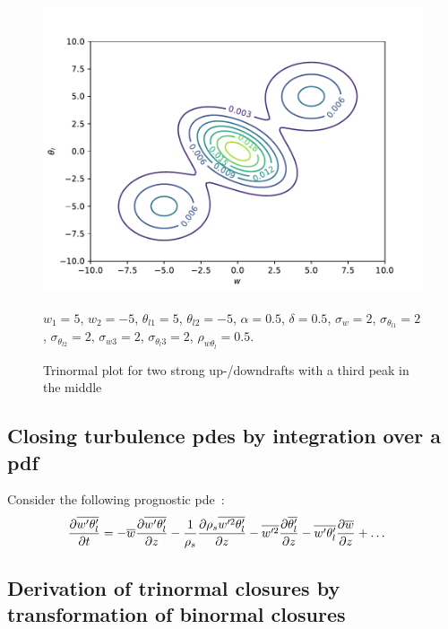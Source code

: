 \documentclass[10pt]{beamer}
\numberwithin{equation}{section}
\begin{document}
    \begin{frame}
        \begin{figure}[!htb]
            \centering
            \includegraphics[width=.5\textwidth]{include/figures/plot4}
            \caption{Trinormal plot for two strong up-/downdrafts with a third peak in the middle}
            \label{fig:plot4}
            $w_1 = 5$, $w_2 = -5$, $\theta_{l1} = 5$, $\theta_{l2} = -5$,
            $\alpha = 0.5$, $\delta=0.5$, $\sigma_w = 2$, $\sigma_{\theta_{l1}} = 2$,
            $\sigma_{\theta_{l2}} = 2$, $\sigma_{w3} = 2$, $\sigma_{\theta_l 3} = 2$,
            $\rho_{w\theta_l} = 0.5$.
        \end{figure}
    \end{frame}

    \subsection{Closing turbulence pdes by integration over a pdf}
    \label{subsec:closing-turbulence-pdes-by-integration-over-a-pdf}

    \begin{frame}
        Consider the following prognostic pde~\autocite[p. 21]{larson2022clubbsilhs}:
        \begin{align*}
            \frac{\partial \overline{w' \theta_l'}}{\partial t}
            &= -\overline{w}\frac{\partial \overline{w' \theta_l'}}{\partial z}
            - \frac{1}{\rho_s} \frac{\partial \rho_s \overline{w'^2 \theta_l'}}{\partial z}
            - \overline{w'^2} \frac{\partial \overline{\theta_l'}}{\partial z}
            - \overline{w' \theta_l'} \frac{\partial \overline{w}}{\partial z}
            + \ldots
        \end{align*}
    \end{frame}

    \subsection{Derivation of trinormal closures by transformation of binormal closures}
    \label{subsec:derivation-of-trinormal-closures-by-transformation-of-binormal-closures}
\end{document}
